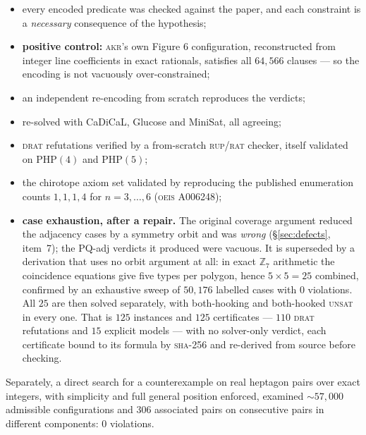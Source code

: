 \documentclass[11pt,a4paper]{article}
\theoremstyle{plain}
\theoremstyle{definition}
\theoremstyle{remark}
\begin{document}
\begin{itemize}[leftmargin=*,nosep]
  \item every encoded predicate was checked against the paper, and each
    constraint is a \emph{necessary} consequence of the hypothesis;
  \item \textbf{positive control:} \textsc{akr}'s own Figure 6 configuration,
    reconstructed from integer line coefficients in exact rationals, satisfies
    all $64{,}566$ clauses --- so the encoding is not vacuously over-constrained;
  \item an independent re-encoding from scratch reproduces the verdicts;
  \item re-solved with CaDiCaL, Glucose and MiniSat, all agreeing;
  \item \textsc{drat} refutations verified by a from-scratch
    \textsc{rup}/\textsc{rat} checker, itself validated on $\mathrm{PHP}(4)$ and
    $\mathrm{PHP}(5)$;
  \item the chirotope axiom set validated by reproducing the published
    enumeration counts $1,1,1,4$ for $n=3,\dots,6$ (\textsc{oeis} A006248);
  \item \textbf{case exhaustion, after a repair.} The original coverage argument
    reduced the adjacency cases by a symmetry orbit and was \emph{wrong}
    (\S\ref{sec:defects}, item~7); the \textsf{PQ-adj} verdicts it produced were
    vacuous. It is superseded by a derivation that uses no orbit argument at
    all: in exact $\mathbb{Z}_7$ arithmetic the coincidence equations give five
    types per polygon, hence $5\times5=25$ combined, confirmed by an exhaustive
    sweep of $50{,}176$ labelled cases with $0$ violations. All $25$ are then
    solved separately, with \textsf{both-hooking} and \textsf{both-hooked}
    \textsc{unsat} in every one. That is $125$ instances and $125$ certificates
    --- $110$ \textsc{drat} refutations and $15$ explicit models --- with no
    solver-only verdict, each certificate bound to its formula by \textsc{sha}-256
    and re-derived from source before checking.
\end{itemize}

Separately, a direct search for a counterexample on real heptagon pairs over
exact integers, with simplicity and full general position enforced, examined
${\sim}57{,}000$ admissible configurations and $306$ associated pairs on
consecutive pairs in different components: $0$ violations.
\end{document}

